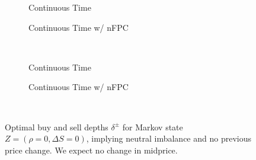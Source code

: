 \begin{figure}
\centering
\begin{subfigure}{.35\linewidth}
  \centering
  \setlength\figureheight{\linewidth} 
  \setlength\figurewidth{\linewidth}
  
  \caption{Continuous Time}
\end{subfigure}%
\hfil%
\begin{subfigure}{.35\linewidth}
  \centering
  \setlength\figureheight{\linewidth}
  \setlength\figurewidth{\linewidth}
   
  \caption{Continuous Time w/ nFPC}
\end{subfigure}\\
\vspace{1cm}
\begin{subfigure}{.35\linewidth}
  \centering
  \setlength\figureheight{\linewidth} 
  \setlength\figurewidth{\linewidth}
  
  \caption{Continuous Time}
\end{subfigure}%
\hfil%
\begin{subfigure}{.35\linewidth}
  \centering
  \setlength\figureheight{\linewidth}
  \setlength\figurewidth{\linewidth}
   
  \caption{Continuous Time w/ nFPC}
\end{subfigure}\\
\vspace{1cm}
\begin{subfigure}{\linewidth}
  \centering
   
\end{subfigure}%
  \caption{Optimal buy and sell depths $\delta^{\pm}$ for Markov state $Z=(\rho = 0, \Delta S = 0)$, implying neutral imbalance and no previous price change. We expect no change in midprice.}
  \label{fig:comp_calib_dm_z8}
\end{figure}

